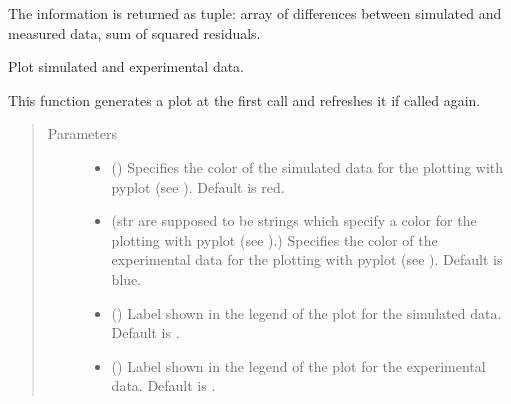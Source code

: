 \documentclass[letterpaper,10pt,english]{sphinxmanual}
\begin{document}
\begin{fulllineitems}
\begin{fulllineitems}
The information is returned as tuple: array of differences between simulated and measured data, sum of squared residuals.

\end{fulllineitems}


\begin{fulllineitems}
\label{\detokenize{modules-api/experiment:Experiment.ReflDataSimulator.plotData}}
Plot simulated and experimental data.

This function generates a plot at the first call and refreshes it if called again.
\begin{quote}\begin{description}
\item[{Parameters}] \leavevmode\begin{itemize}
\item {} 
 () \textendash{} Specifies the color of the simulated data for the plotting with pyplot (see ). Default is red.

\item {} 
 (str  are supposed to be strings which specify a color for the plotting with pyplot (see ).) \textendash{} Specifies the color of the experimental data for the plotting with pyplot (see ). Default is blue.

\item {} 
 () \textendash{} Label shown in the legend of the plot for the simulated data. Default is .

\item {} 
 () \textendash{} Label shown in the legend of the plot for the experimental data. Default is .

\end{itemize}


\end{description}
\end{quote}
\end{fulllineitems}
\end{fulllineitems}
\end{document}
